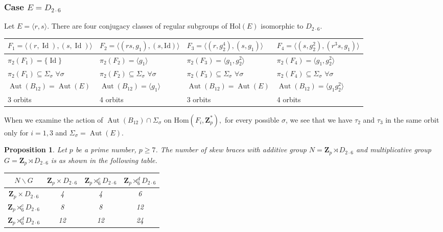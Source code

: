 \documentclass[12pt]{article}
\newtheorem{proposition}[theorem]{Proposition}
\theoremstyle{definition}
\newcommand{\Z}{\mathbf Z}
\newcommand{\Hom}{\mathrm{Hom}}
\newcommand{\Aut}{\operatorname{Aut}}
\newcommand{\Id}{\operatorname{Id}}
\begin{document}
\subsubsection*{Case $E=D_{2\cdot6}$}

Let $E=\langle r,s\rangle$. 
There are four conjugacy classes of regular subgroups of $\mathrm{Hol}(E)$ isomorphic to $D_{2\cdot6}$. 

\begin{center}
    \begin{tabular}{|l|l|l|l|}
    
    \hline
       $F_1=\langle (r,\Id),(s,\Id)\rangle$ &
     $ F_2=\langle(rs,g_1),(s,\mathrm{Id})\rangle$&
      $F_3=\langle(r,g_2^4),(s,g_1)\rangle$&
      $F_4=\langle(s,g_2^2),(r^3s,g_1)\rangle$\\
      \hline
      $\pi_2(F_1)=\{\Id\}$&$\pi_2(F_2)=\langle g_1\rangle$ &
       $\pi_2(F_3)=\langle g_1,g_2^2\rangle$&
        $\pi_2(F_4)=\langle g_1,g_2^2\rangle$\\
      $\pi_2(F_1)\subseteq \Sigma_{\sigma}$ $\forall \sigma$ & 
      $\pi_2(F_2)\subseteq \Sigma_{\sigma}$ $\forall \sigma$ &
      $\pi_2(F_3)\subseteq \Sigma_{\sigma}$ $\forall \sigma$ &
      $\pi_2(F_4)\subseteq \Sigma_{\sigma}$ $\forall \sigma$
       \\
       $\Aut(B_{12})= \Aut(E)$&
       $\Aut(B_{12})=\langle g_1\rangle$ &$\Aut(B_{12})= \Aut(E)$&
       $\Aut(B_{12})=\langle g_1g_2^2\rangle$\\
       3 orbits & 4 orbits & 3 orbits & 4 orbits\\
      \hline
    \end{tabular}
\end{center}    

When we examine the action of $\Aut(B_{12})\cap \Sigma_{\sigma}$ on $\Hom(F_i,\Z_p^*),$ for every possible $\sigma$, 
we see that we have $\tau_2$ and $\tau_3$ in the same orbit only for $i=1,3$ and $\Sigma_{\sigma}=\Aut(E)$.

\begin{proposition}
	Let $p$ be a prime number, $p\geq 7$.
	The number of skew braces with additive group $N=\Z_p\rtimes D_{2\cdot 6}$ and multiplicative group $G=\Z_p\rtimes D_{2\cdot 6}$ is as shown in the following table.
	
	\begin{center}
		\begin{tabular}{|c||c|c|c|}
			\hline
			$N \backslash G$ & $\Z_p\times D_{2\cdot 6}$ & $\Z_p\rtimes_6^c D_{2\cdot 6} $ & $\Z_p\rtimes_6^d D_{2\cdot 6}$ \\
			\hline
			\hline
			$\Z_p\times D_{2\cdot 6}$ & 4 & 4 & 6 \\ \hline $\Z_p\rtimes_6^c D_{2\cdot 6} $ & 8 & 8 & 12 \\ \hline
			$\Z_p\rtimes_6^d D_{2\cdot 6} $ & 12 & 12 & 24 \\ \hline
		\end{tabular}
	\end{center}
\end{proposition}
\end{document}
